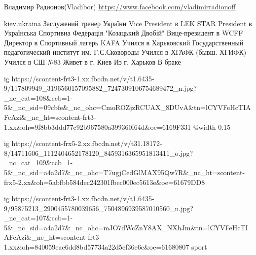  
 
 
 
 

Владимир Радионов(Vladibor)
\url{https://www.facebook.com/vladimirradionoff}\par
kiev.ukraina
Заслужений тренер України
Vice President в LEK STAR
President в Українська Спортивна Федерація "Козацький Двобій"
Вице-президент в WCFF
Директор в Спортивный лагерь KAFA
Учился в Харьковский Государственный педагогический институт им. Г.С.Сковороды
Учился в ХГАФК (бывш. ХГИФК)
Учился в СШ №83
Живет в г. Киев
Из г. Харьков
В браке
\ifcmt

  ig https://scontent-frt3-1.xx.fbcdn.net/v/t1.6435-9/117809949_3196560157095882_7247309106754689472_n.jpg?_nc_cat=108&ccb=1-5&_nc_sid=09cbfe&_nc_ohc=CmoROZjzRCUAX_8DUvA&tn=lCYVFeHcTIAFcAzi&_nc_ht=scontent-frt3-1.xx&oh=9f8bb3ddd77c92b967580a399360f64d&oe=6169F331
\fi
\ifcmt
  @width 0.15

  ig https://scontent-frx5-2.xx.fbcdn.net/v/t31.18172-8/14711606_1112404652178120_8459316365951813411_o.jpg?_nc_cat=109&ccb=1-5&_nc_sid=a4a2d7&_nc_ohc=T7ugjCedGlMAX95Qw7R&_nc_ht=scontent-frx5-2.xx&oh=5abfbb584dec242301fbec000ec5613e&oe=61679DD8

  ig https://scontent-frt3-1.xx.fbcdn.net/v/t1.6435-9/95875213_2900455780039656_7504896939587010560_n.jpg?_nc_cat=107&ccb=1-5&_nc_sid=a4a2d7&_nc_ohc=mJO7dWcZnY8AX_NXhJm&tn=lCYVFeHcTIAFcAzi&_nc_ht=scontent-frt3-1.xx&oh=840059eae6dd8bd57734a22d5ef36e6c&oe=61680807
\fi
sport

